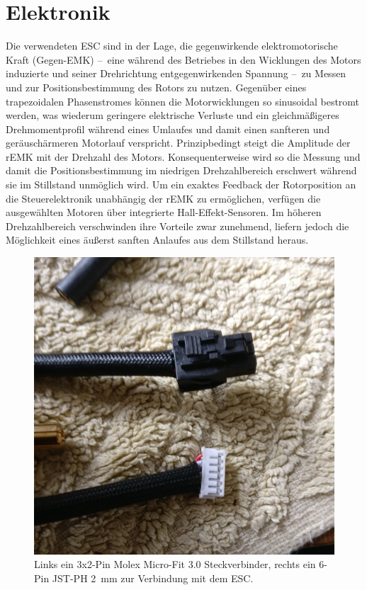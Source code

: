 \chapter{Elektronik}
%
%
%
	Die verwendeten ESC sind in der Lage, die gegenwirkende elektromotorische Kraft (Gegen-EMK) --~eine während des Betriebes in den Wicklungen des Motors induzierte und seiner Drehrichtung entgegenwirkenden Spannung --~zu Messen und zur Positionsbestimmung des Rotors zu nutzen.
	Gegenüber eines trapezoidalen Phasenstromes können die Motorwicklungen so sinusoidal bestromt werden, was wiederum geringere elektrische Verluste und ein gleichmäßigeres Drehmomentprofil während eines Umlaufes und damit einen sanfteren und geräuschärmeren Motorlauf verspricht.
	Prinzipbedingt steigt die Amplitude der rEMK mit der Drehzahl des Motors.
	Konsequenterweise wird so die Messung und damit die Positionsbestimmung im niedrigen Drehzahlbereich erschwert während sie im Stillstand unmöglich wird.
	Um ein exaktes Feedback der Rotorposition an die Steuerelektronik unabhängig der rEMK zu ermöglichen, verfügen die ausgewählten Motoren über integrierte Hall-Effekt-Sensoren.
	Im höheren Drehzahlbereich verschwinden ihre Vorteile zwar zunehmend, liefern jedoch die Möglichkeit eines äußerst sanften Anlaufes aus dem Stillstand heraus.\par\medskip
	\begin{figure}
		\centering
		\includegraphics[angle=90, width=.4\textwidth]{Footage/Pictures/Hall sensor connector.jpg}
		\caption[Hall-Sensoren Steckverbinder]{Links ein 3x2-Pin Molex Micro-Fit 3.0 Steckverbinder, rechts ein 6-Pin JST-PH \qty{2}{\milli\metre} zur Verbindung mit dem ESC.}
		\label{fig:hall sensor connectors}
	\end{figure}
